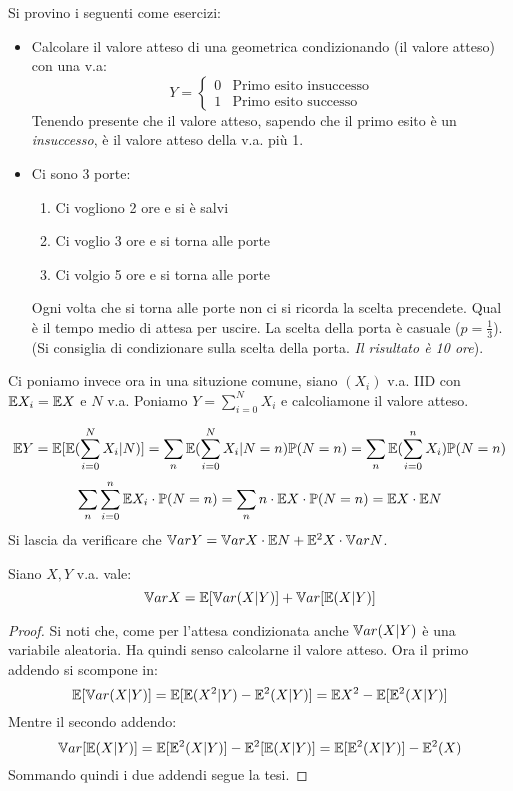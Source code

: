 Si provino i seguenti come esercizi:
\begin{itemize}
    \item Calcolare il valore atteso di una geometrica condizionando (il valore atteso) con una v.a: $$Y= 
    \begin{cases}
    0 & \text{Primo esito insuccesso}
    \\ 1 & \text{Primo esito successo}
    \end{cases}$$
    Tenendo presente che il valore atteso, sapendo che il primo esito è un \textit{insuccesso}, è il valore atteso della v.a. più 1.
    \item Ci sono 3 porte:
    \begin{enumerate}
        \item Ci vogliono 2 ore e si è salvi
        \item Ci voglio 3 ore e si torna alle porte
        \item Ci volgio 5 ore e si torna alle porte
    \end{enumerate}
    Ogni volta che si torna alle porte non ci si ricorda la scelta precendete. Qual è il tempo medio di attesa per uscire. La scelta della porta è casuale ($p=\frac{1}{3}$). (Si consiglia di condizionare sulla scelta della porta. \textit{Il risultato è 10 ore}).
\end{itemize}

Ci poniamo invece ora in una situzione comune, siano $(X_i)$ v.a. IID con $\mathbb{E} X_i=\mathbb{E} X$ e $N$ v.a. Poniamo $Y=\sum_{i=0}^NX_i$ e calcoliamone il valore atteso.

\[\mathbb{E} Y=\mathbb{E}[\mathbb{E}(\sum_{i=0}^N X_i|N)]=\sum_n\mathbb{E}(\sum_{i=0}^N X_i|N=n)\mathbb{P}(N=n)=\sum_n\mathbb{E}(\sum_{i=0}^n X_i)\mathbb{P}(N=n)\]
\[\sum_n \sum_{i=0}^n\mathbb{E} X_i \cdot\mathbb{P}(N=n)=\sum_n n\cdot\mathbb{E} X\cdot \mathbb{P}(N=n)=\mathbb{E} X\cdot\mathbb{E} N\]
Si lascia da verificare che $\mathbb{V}arY = \mathbb{V}arX\cdot\mathbb{E} N+\mathbb{E}^2X\cdot\mathbb{V}arN$.

\begin{theorem}\label{Varr}
Siano $X,Y$ v.a. vale:
\begin{equation}
    \mathbb{V}ar X=\mathbb{E}[\mathbb{V}ar(X|Y)]+\mathbb{V}ar[\mathbb{E}(X|Y)]
\end{equation}
\begin{proof}
Si noti che, come per l'attesa condizionata anche $\mathbb{V}ar (X|Y)$ è una variabile aleatoria. Ha quindi senso calcolarne il valore atteso. Ora il primo addendo si scompone in:
\[\mathbb{E}[\mathbb{V}ar(X|Y)]=\mathbb{E}[\mathbb{E}(X^2|Y)-\mathbb{E}^2(X|Y)]=\mathbb{E} X^2-\mathbb{E}[\mathbb{E}^2(X|Y)]\]
Mentre il secondo addendo:
\[\mathbb{V}ar[\mathbb{E}(X|Y)]=\mathbb{E}[\mathbb{E}^2(X|Y)]-\mathbb{E}^2[\mathbb{E}(X|Y)]=\mathbb{E}[\mathbb{E}^2(X|Y)]-\mathbb{E}^2(X)\]
Sommando quindi i due addendi segue la tesi.
\end{proof}
\end{theorem}
